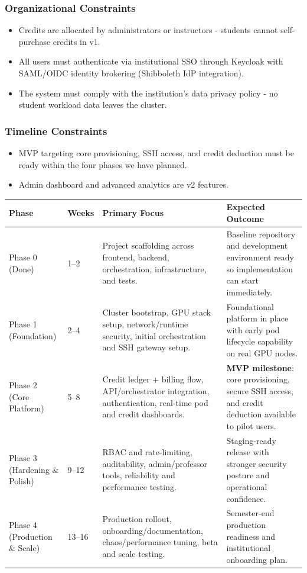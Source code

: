 \documentclass[12pt,a4paper]{article}
\begin{document}
\subsubsection*{Organizational Constraints}
\begin{itemize}[leftmargin=1.5em]
  \item Credits are allocated by administrators or instructors - students cannot self-purchase credits in v1.
  \item All users must authenticate via institutional SSO through Keycloak with SAML/OIDC identity brokering (Shibboleth IdP integration).
  \item The system must comply with the institution's data privacy policy - no student workload data leaves the cluster.
\end{itemize}

\subsubsection*{Timeline Constraints}
\begin{itemize}[leftmargin=1.5em]
  \item MVP targeting core provisioning, SSH access, and credit deduction must be ready within the four phases we have planned. 
  \item Admin dashboard and advanced analytics are v2 features.
\end{itemize}

\begin{tabularx}{\textwidth}{@{}L{2.4cm}C{1.2cm}L{4.8cm}X@{}}
   \textbf{Phase} & \textbf{Weeks} & \textbf{Primary Focus} & \textbf{Expected Outcome} \\
  \midrule
  Phase 0 (Done)
    & 1--2
    & Project scaffolding across frontend, backend, orchestration, infrastructure, and tests.
    & Baseline repository and development environment ready so implementation can start immediately. \\
  Phase 1 (Foundation)
    & 2--4
    & Cluster bootstrap, GPU stack setup, network/runtime security, initial orchestration and SSH gateway setup.
    & Foundational platform in place with early pod lifecycle capability on real GPU nodes. \\
  Phase 2 (Core Platform)
    & 5--8
    & Credit ledger + billing flow, API/orchestrator integration, authentication, real-time pod and credit dashboards.
    & \textbf{MVP milestone}: core provisioning, secure SSH access, and credit deduction available to pilot users. \\
  Phase 3 (Hardening \& Polish)
    & 9--12
    & RBAC and rate-limiting, auditability, admin/professor tools, reliability and performance testing.
    & Staging-ready release with stronger security posture and operational confidence. \\
  Phase 4 (Production \& Scale)
    & 13--16
    & Production rollout, onboarding/documentation, chaos/performance tuning, beta and scale testing.
    & Semester-end production readiness and institutional onboarding plan. \\
\end{tabularx}
\end{document}
